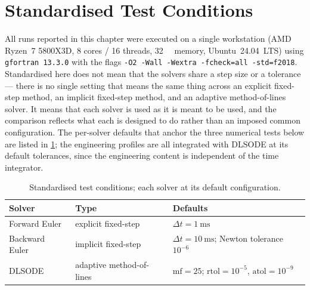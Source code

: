 \section{Standardised Test Conditions}\label{sec:test_conditions}

All runs reported in this chapter were executed on a single workstation (AMD Ryzen~7 5800X3D, 8 cores / 16 threads, \SI{32}{\gibi\byte} memory, Ubuntu~24.04~LTS) using \texttt{gfortran 13.3.0} with the flags \texttt{-O2 -Wall -Wextra -fcheck=all -std=f2018}. Standardised here does not mean that the solvers share a step size or a tolerance --- there is no single setting that means the same thing across an explicit fixed-step method, an implicit fixed-step method, and an adaptive method-of-lines solver. It means that each solver is used as it is meant to be used, and the comparison reflects what each is designed to do rather than an imposed common configuration. The per-solver defaults that anchor the three numerical tests below are listed in \cref{tab:test_conditions}; the engineering profiles are all integrated with DLSODE at its default tolerances, since the engineering content is independent of the time integrator.

\begin{table}[H]
\centering
\footnotesize
\caption{Standardised test conditions; each solver at its default configuration.}\label{tab:test_conditions}
\begin{tabular*}{\textwidth}{@{\extracolsep{\fill}}lll}
\toprule
Solver & Type & Defaults \\
\midrule
Forward Euler  & explicit fixed-step       & \(\Delta t = \SI{1}{\milli\second}\) \\
Backward Euler & implicit fixed-step       & \(\Delta t = \SI{10}{\milli\second}\); Newton tolerance \(10^{-6}\) \\
DLSODE         & adaptive method-of-lines  & \(\mathrm{mf} = 25\)\footnotemark; \(\mathrm{rtol} = 10^{-5}\), \(\mathrm{atol} = 10^{-9}\) \\
\bottomrule
\end{tabular*}
\end{table}

